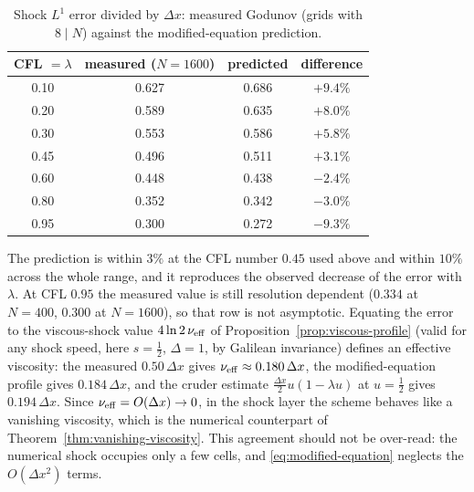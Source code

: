 \begin{table}[h]
\centering
\begin{tabular}{c c c c}
  CFL $=\lambda$ & measured ($N=1600$) & predicted & difference \\\hline
  0.10 & 0.627 & 0.686 & $+9.4\%$ \\
  0.20 & 0.589 & 0.635 & $+8.0\%$ \\
  0.30 & 0.553 & 0.586 & $+5.8\%$ \\
  0.45 & 0.496 & 0.511 & $+3.1\%$ \\
  0.60 & 0.448 & 0.438 & $-2.4\%$ \\
  0.80 & 0.352 & 0.342 & $-3.0\%$ \\
  0.95 & 0.300 & 0.272 & $-9.3\%$
\end{tabular}
\caption{Shock $L^1$ error divided by $\Delta x$: measured Godunov (grids with
$8\mid N$) against the modified-equation prediction.}
\label{tab:numerical-viscosity}
\end{table}

The prediction is within $3\%$ at the CFL number $0.45$ used above and within
$10\%$ across the whole range, and it reproduces the observed decrease of the
error with $\lambda$. At CFL $0.95$ the measured value is still resolution
dependent ($0.334$ at $N=400$, $0.300$ at $N=1600$), so that row is not
asymptotic. Equating the error to the viscous-shock value $4\ln2\,\nu_{\rm eff}$
of Proposition~\ref{prop:viscous-profile} (valid for any shock speed, here
$s=\tfrac12$, $\Delta=1$, by Galilean invariance) defines an effective viscosity: the
measured $0.50\,\Delta x$ gives $\nu_{\rm eff}\approx0.180\,\Delta x$, the
modified-equation profile gives $0.184\,\Delta x$, and the cruder estimate
$\tfrac{\Delta x}2u(1-\lambda u)$ at $u=\tfrac12$ gives $0.194\,\Delta x$.
Since $\nu_{\rm eff}=O(\Delta x)\to0$, in the shock layer the scheme behaves
like a vanishing viscosity, which is the numerical counterpart of
Theorem~\ref{thm:vanishing-viscosity}. This agreement should not be over-read:
the numerical shock occupies only a few cells, and
\eqref{eq:modified-equation} neglects the $O(\Delta x^2)$ terms.